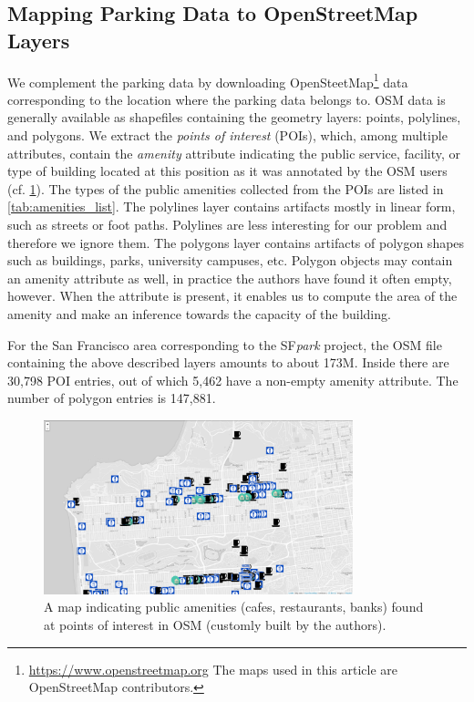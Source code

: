 	\subsection{Mapping Parking Data to OpenStreetMap Layers}
	We complement the parking data by downloading OpenSteetMap\footnote{\url{https://www.openstreetmap.org} The maps used in this article are \textcopyright OpenStreetMap contributors.} data corresponding to the location where the parking data belongs to. OSM data is generally available as shapefiles containing the geometry layers: points, polylines, and polygons. We extract the \textit{points of interest} (POIs), which, among multiple attributes, contain the \textit{amenity} attribute indicating the public service, facility, or type of building located at this position as it was annotated by the OSM users (cf. \cref{fig:pois}). The types of the public amenities collected from the POIs are listed in \cref{tab:amenities_list}. The polylines layer contains artifacts mostly in linear form, such as streets or foot paths. Polylines are less interesting for our problem and therefore we ignore them. The polygons layer contains artifacts of polygon shapes such as buildings, parks, university campuses, etc. Polygon objects may contain an amenity attribute as well, in practice the authors have found it often empty, however. When the attribute is present, it enables us to compute the area of the amenity and make an inference towards the capacity of the building.
	
	For the San Francisco area corresponding to the SF\textit{park} project, the OSM file containing the above described layers amounts to about 173M. Inside there are 30,798 POI entries, out of which 5,462 have a non-empty amenity attribute. The number of polygon entries is 147,881.  
	
	\begin{figure}[!ht]
		\centering
		\includegraphics[width=0.8\textwidth]{graphics/cafes_restaurants_banks_larger.png}
		\caption{A map indicating public amenities (cafes, restaurants, banks) found at points of interest in OSM (customly built by the authors).}
		\label{fig:pois}
	\end{figure}
	
